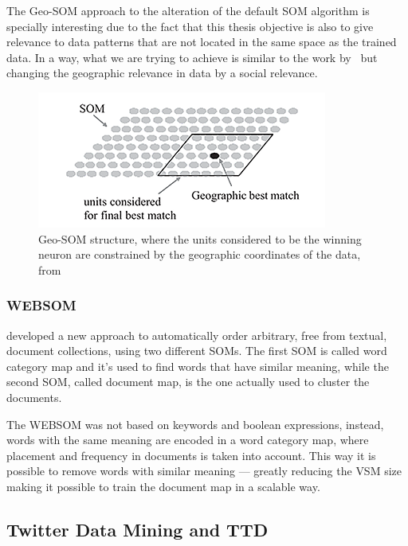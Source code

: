 \documentclass[journal]{IEEEtran}
\begin{document}
The Geo-SOM approach to the alteration of the default \ac{SOM} algorithm is specially interesting due to the fact that this thesis objective is also to give relevance to data patterns that are not located in the same space as the trained data. In a way, what we are trying to achieve is similar to the work by~\citet{Bacao2005} but changing the geographic relevance in data by a social relevance.
\begin{figure}[tb]
  \begin{center}
    \includegraphics[width=0.8\linewidth]{images/6_geo-som.png}
  \end{center}
  \caption{Geo-SOM structure, where the units considered to be the winning neuron are constrained by the geographic coordinates of the data, from~\citet{Bacao2005}}
  \label{fig:geo_som}
\end{figure}

\subsubsection{WEBSOM}
\label{sub:websom}
\citet{honkelawebsom} developed a new approach to automatically order arbitrary, free from textual, document collections, using two different SOMs. The first \ac{SOM} is called word category map and it's used to find words that have similar meaning, while the second \ac{SOM}, called document map, is the one actually used to cluster the documents. 

The WEBSOM was not based on keywords and boolean expressions, instead, words with the same meaning are encoded in a word category map, where placement and frequency in documents is taken into account. This way it is possible to remove words with similar meaning --- greatly reducing the \ac{VSM} size  making it possible to train the document map in a scalable way.
                                                                                                          
\subsection{Twitter Data Mining and TTD} 
\label{sec:data_mining_in_twitter_}
\end{document}
